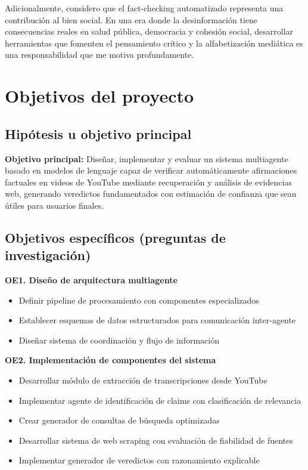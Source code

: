 \documentclass[12pt,a4paper]{article}
\begin{document}
Adicionalmente, considero que el fact-checking automatizado representa una contribución al bien social. En una era donde la desinformación tiene consecuencias reales en salud pública, democracia y cohesión social, desarrollar herramientas que fomenten el pensamiento crítico y la alfabetización mediática es una responsabilidad que me motiva profundamente.

\section{Objetivos del proyecto}

\subsection{Hipótesis u objetivo principal}

\textbf{Objetivo principal:} Diseñar, implementar y evaluar un sistema multiagente basado en modelos de lenguaje capaz de verificar automáticamente afirmaciones factuales en videos de YouTube mediante recuperación y análisis de evidencias web, generando veredictos fundamentados con estimación de confianza que sean útiles para usuarios finales.

\subsection{Objetivos específicos (preguntas de investigación)}

\textbf{OE1. Diseño de arquitectura multiagente}
\begin{itemize}
    \item Definir pipeline de procesamiento con componentes especializados
    \item Establecer esquemas de datos estructurados para comunicación inter-agente
    \item Diseñar sistema de coordinación y flujo de información
\end{itemize}

\textbf{OE2. Implementación de componentes del sistema}
\begin{itemize}
    \item Desarrollar módulo de extracción de transcripciones desde YouTube
    \item Implementar agente de identificación de claims con clasificación de relevancia
    \item Crear generador de consultas de búsqueda optimizadas
    \item Desarrollar sistema de web scraping con evaluación de fiabilidad de fuentes
    \item Implementar generador de veredictos con razonamiento explicable
\end{itemize}
\end{document}
